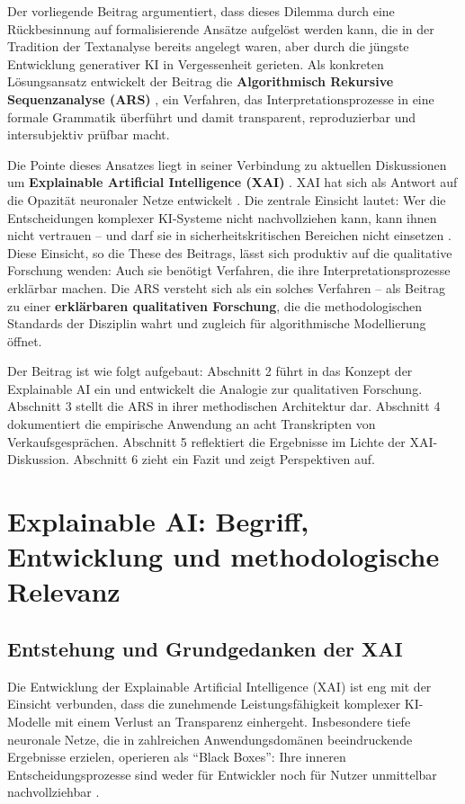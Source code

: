\documentclass[
  12pt,
  a4paper,
  oneside,
  titlepage
]{article}
\begin{document}
Der vorliegende Beitrag argumentiert, dass dieses Dilemma durch eine Rückbesinnung auf 
formalisierende Ansätze aufgelöst werden kann, die in der Tradition der Textanalyse 
bereits angelegt waren, aber durch die jüngste Entwicklung generativer KI in 
Vergessenheit gerieten. Als konkreten Lösungsansatz entwickelt der Beitrag die 
\textbf{Algorithmisch Rekursive Sequenzanalyse (ARS)} , ein Verfahren, das 
Interpretationsprozesse in eine formale Grammatik überführt und damit transparent, 
reproduzierbar und intersubjektiv prüfbar macht.

Die Pointe dieses Ansatzes liegt in seiner Verbindung zu aktuellen Diskussionen um 
\textbf{Explainable Artificial Intelligence (XAI)} . XAI hat sich als Antwort auf die 
Opazität neuronaler Netze entwickelt \citep{Samek2019, BarredoArrieta2020}. Die zentrale 
Einsicht lautet: Wer die Entscheidungen komplexer KI-Systeme nicht nachvollziehen kann, 
kann ihnen nicht vertrauen – und darf sie in sicherheitskritischen Bereichen nicht 
einsetzen \citep{Weller2019}. Diese Einsicht, so die These des Beitrags, lässt sich 
produktiv auf die qualitative Forschung wenden: Auch sie benötigt Verfahren, die ihre 
Interpretationsprozesse erklärbar machen. Die ARS versteht sich als ein solches 
Verfahren – als Beitrag zu einer \textbf{erklärbaren qualitativen Forschung}, die die 
methodologischen Standards der Disziplin wahrt und zugleich für algorithmische 
Modellierung öffnet.

Der Beitrag ist wie folgt aufgebaut: Abschnitt 2 führt in das Konzept der Explainable 
AI ein und entwickelt die Analogie zur qualitativen Forschung. Abschnitt 3 stellt die 
ARS in ihrer methodischen Architektur dar. Abschnitt 4 dokumentiert die empirische 
Anwendung an acht Transkripten von Verkaufsgesprächen. Abschnitt 5 reflektiert die 
Ergebnisse im Lichte der XAI-Diskussion. Abschnitt 6 zieht ein Fazit und zeigt 
Perspektiven auf.

\section{Explainable AI: Begriff, Entwicklung und methodologische Relevanz}

\subsection{Entstehung und Grundgedanken der XAI}

Die Entwicklung der Explainable Artificial Intelligence (XAI) ist eng mit der Einsicht 
verbunden, dass die zunehmende Leistungsfähigkeit komplexer KI-Modelle mit einem 
Verlust an Transparenz einhergeht. Insbesondere tiefe neuronale Netze, die in 
zahlreichen Anwendungsdomänen beeindruckende Ergebnisse erzielen, operieren als 
\enquote{Black Boxes}: Ihre inneren Entscheidungsprozesse sind weder für Entwickler 
noch für Nutzer unmittelbar nachvollziehbar \citep[ S.~2]{Samek2019}.
\end{document}
